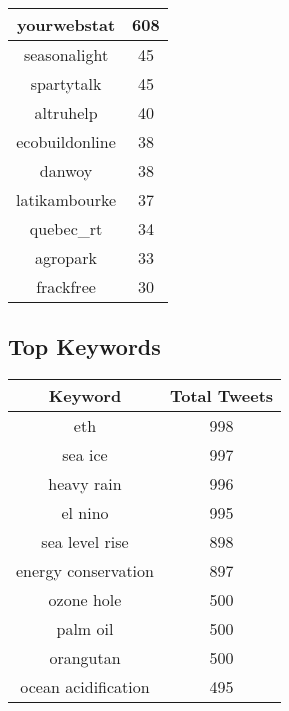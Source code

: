 \documentclass{article}\usepackage[T1]{fontenc}
\begin{document}
\begin{tabular}{|c|c|}
 \hline
yourwebstat & 608\\ 
 \hline
seasonalight & 45\\ 
 \hline
spartytalk & 45\\ 
 \hline
altruhelp & 40\\ 
 \hline
ecobuildonline & 38\\ 
 \hline
danwoy & 38\\ 
 \hline
latikambourke & 37\\ 
 \hline
quebec\_rt & 34\\ 
 \hline
agropark & 33\\ 
 \hline
frackfree & 30\\ 
 \hline
\end{tabular}\subsection*{Top Keywords}\begin{tabular}{|c|c|}         \hline         Keyword & Total Tweets \\ 
 \hline
eth & 998\\ 
 \hline
sea ice & 997\\ 
 \hline
heavy rain & 996\\ 
 \hline
el nino & 995\\ 
 \hline
sea level rise & 898\\ 
 \hline
energy conservation & 897\\ 
 \hline
ozone hole & 500\\ 
 \hline
palm oil & 500\\ 
 \hline
orangutan & 500\\ 
 \hline
ocean acidification & 495\\ 
 \hline
\end{tabular}
\end{document}
